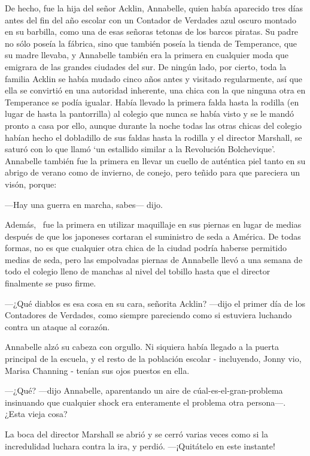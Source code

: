 De hecho, fue la hija del señor Acklin, Annabelle, quien había aparecido
tres días antes del fin del año escolar con un Contador de Verdades azul
oscuro montado en su barbilla, como una de esas señoras tetonas de los
barcos piratas. Su padre no sólo poseía la fábrica, sino que también
poseía la tienda de Temperance, que su madre llevaba, y Annabelle
también era la primera en cualquier moda que emigrara de las grandes
ciudades del sur. De ningún lado, por cierto, toda la familia Acklin se
había mudado cinco años antes y visitado regularmente, así que ella se
convirtió en una autoridad inherente, una chica con la que ninguna otra
en Temperance se podía igualar. Había llevado la primera falda hasta la
rodilla (en lugar de hasta la pantorrilla) al colegio que nunca se había
visto y se le mandó pronto a casa por ello, aunque durante la noche
todas las otras chicas del colegio habían hecho el dobladillo de sus
faldas hasta la rodilla y el director Marshall, se saturó con lo que
llamó `un estallido similar a la Revolución Bolchevique'. Annabelle
también fue la primera en llevar un cuello de auténtica piel tanto en su
abrigo de verano como de invierno, de conejo, pero teñido para que
pareciera un visón, porque:

---Hay una guerra en marcha, sabes--- dijo.

Además, ~fue la primera en utilizar maquillaje en sus piernas en lugar
de medias después de que los japoneses cortaran el suministro de seda a
América. De todas formas, no es que cualquier otra chica de la ciudad
podría haberse permitido medias de seda, pero las empolvadas piernas de
Annabelle llevó a una semana de todo el colegio lleno de manchas al
nivel del tobillo hasta que el director finalmente se puso firme.

---¿Qué diablos es esa cosa en su cara, señorita Acklin? ---dijo el
primer día de los Contadores de Verdades, como siempre pareciendo como
si estuviera luchando contra un ataque al corazón.

Annabelle alzó su cabeza con orgullo. Ni siquiera había llegado a la
puerta principal de la escuela, y el resto de la población escolar -
incluyendo, Jonny vio, Marisa Channing - tenían sus ojos puestos en
ella.

---¿Qué? ---dijo Annabelle, aparentando un aire de
cúal-es-el-gran-problema insinuando que cualquier shock era enteramente
el problema otra persona---. ¿Esta vieja cosa?

La boca del director Marshall se abrió y se cerró varias veces como si
la incredulidad luchara contra la ira, y perdió. ---¡Quitátelo en este
instante!

